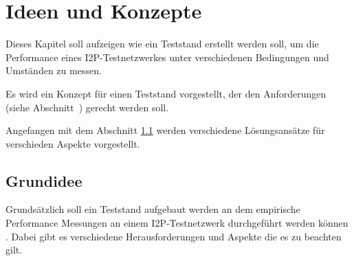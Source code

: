 \chapter{Ideen und Konzepte}

Dieses Kapitel soll aufzeigen wie ein Teststand erstellt werden soll, um die Performance eines I2P-Testnetzwerkes unter verschiedenen Bedingungen und Umständen zu messen.

Es wird ein Konzept für einen Teststand vorgestellt, der den Anforderungen (siehe Abschnitt~) gerecht werden soll.

Angefangen mit dem Abschnitt \ref{sec:grundidee} werden verschiedene Lösungsansätze für verschieden Aspekte vorgestellt.

\section{Grundidee}\label{sec:grundidee}



Grundsätzlich soll ein Teststand aufgebaut werden an dem empirische Performance Messungen an einem I2P-Testnetzwerk durchgeführt werden können .
Dabei gibt es verschiedene Herausforderungen und Aspekte die es zu beachten gilt.


